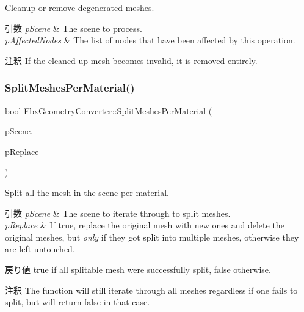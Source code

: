 Cleanup or remove degenerated meshes. 
\begin{DoxyParams}{引数}
{\em p\+Scene} & The scene to process. \\
\hline
{\em p\+Affected\+Nodes} & The list of nodes that have been affected by this operation. \\
\hline
\end{DoxyParams}
\begin{DoxyRemark}{注釈}
If the cleaned-\/up mesh becomes invalid, it is removed entirely. 
\end{DoxyRemark}
\mbox{\label{class_fbx_geometry_converter_aed7a7dd03d949e08e008262fd5b57421}} 
\subsubsection{\texorpdfstring{Split\+Meshes\+Per\+Material()}{SplitMeshesPerMaterial()}}
{\footnotesize\ttfamily bool Fbx\+Geometry\+Converter\+::\+Split\+Meshes\+Per\+Material (\begin{DoxyParamCaption}\item[{\hyperlink{class_fbx_scene}{Fbx\+Scene} $\ast$}]{p\+Scene,  }\item[{bool}]{p\+Replace }\end{DoxyParamCaption})}

Split all the mesh in the scene per material. 
\begin{DoxyParams}{引数}
{\em p\+Scene} & The scene to iterate through to split meshes. \\
\hline
{\em p\+Replace} & If {\ttfamily true}, replace the original mesh with new ones and delete the original meshes, but {\itshape only} if they got split into multiple meshes, otherwise they are left untouched. \\
\hline
\end{DoxyParams}
\begin{DoxyReturn}{戻り値}
{\ttfamily true} if all splitable mesh were successfully split, {\ttfamily false} otherwise. 
\end{DoxyReturn}
\begin{DoxyRemark}{注釈}
The function will still iterate through all meshes regardless if one fails to split, but will return false in that case. 
\end{DoxyRemark}
\mbox{\label{class_fbx_geometry_converter_a3b48927a9d9394344598d1e9e80499bf}} 
